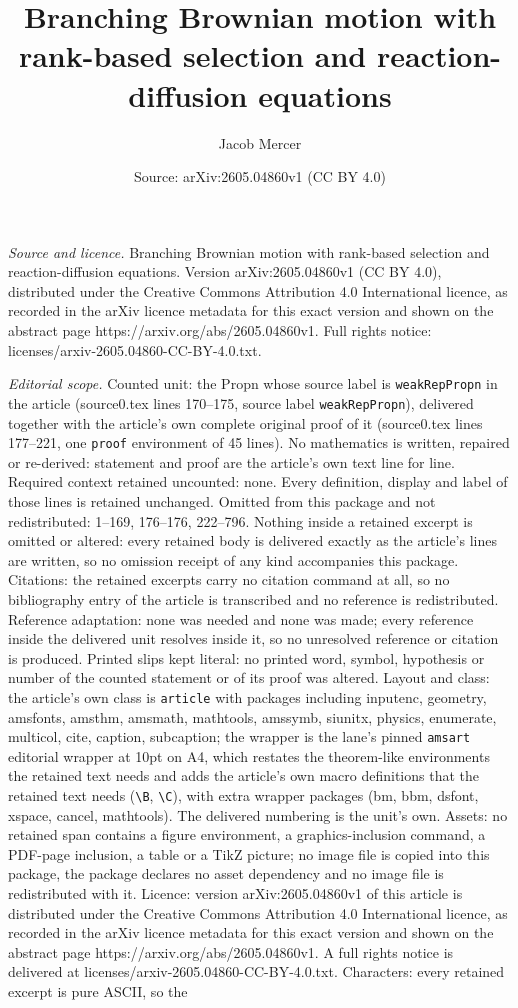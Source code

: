 \documentclass[10pt,a4paper]{amsart}
\title[Branching Brownian motion with rank-based selection and reac]{Branching Brownian motion with rank-based selection and reaction-diffusion equations}
\author{Jacob Mercer}
\date{Source: arXiv:2605.04860v1 (CC BY 4.0)}
\begin{document}
\maketitle

\noindent\emph{Source and licence.} Branching Brownian motion with rank-based selection and reaction-diffusion equations. Version arXiv:2605.04860v1 (CC BY 4.0), distributed under the Creative Commons Attribution 4.0 International licence, as recorded in the arXiv licence metadata for this exact version and shown on the abstract page https://arxiv.org/abs/2605.04860v1. Full rights notice: licenses/arxiv-2605.04860-CC-BY-4.0.txt.\par\smallskip

\noindent\textit{Editorial scope.} Counted unit: the Propn whose source label is \texttt{weakRepPropn} in the article (source0.tex lines 170--175, source label \texttt{weakRepPropn}), delivered together with the article's own complete original proof of it (source0.tex lines 177--221, one \texttt{proof} environment of 45 lines). No mathematics is written, repaired or re-derived: statement and proof are the article's own text line for line. Required context retained uncounted: none. Every definition, display and label of those lines is retained unchanged. Omitted from this package and not redistributed: 1--169, 176--176, 222--796. Nothing inside a retained excerpt is omitted or altered: every retained body is delivered exactly as the article's lines are written, so no omission receipt of any kind accompanies this package. Citations: the retained excerpts carry no citation command at all, so no bibliography entry of the article is transcribed and no reference is redistributed. Reference adaptation: none was needed and none was made; every reference inside the delivered unit resolves inside it, so no unresolved reference or citation is produced. Printed slips kept literal: no printed word, symbol, hypothesis or number of the counted statement or of its proof was altered. Layout and class: the article's own class is \texttt{article} with packages including inputenc, geometry, amsfonts, amsthm, amsmath, mathtools, amssymb, siunitx, physics, enumerate, multicol, cite, caption, subcaption; the wrapper is the lane's pinned \texttt{amsart} editorial wrapper at 10pt on A4, which restates the theorem-like environments the retained text needs and adds the article's own macro definitions that the retained text needs (\texttt{\textbackslash B}, \texttt{\textbackslash C}), with extra wrapper packages (bm, bbm, dsfont, xspace, cancel, mathtools). The delivered numbering is the unit's own. Assets: no retained span contains a figure environment, a graphics-inclusion command, a PDF-page inclusion, a table or a TikZ picture; no image file is copied into this package, the package declares no asset dependency and no image file is redistributed with it. Licence: version arXiv:2605.04860v1 of this article is distributed under the Creative Commons Attribution 4.0 International licence, as recorded in the arXiv licence metadata for this exact version and shown on the abstract page https://arxiv.org/abs/2605.04860v1. A full rights notice is delivered at licenses/arxiv-2605.04860-CC-BY-4.0.txt. Characters: every retained excerpt is pure ASCII, so the 
\end{document}

